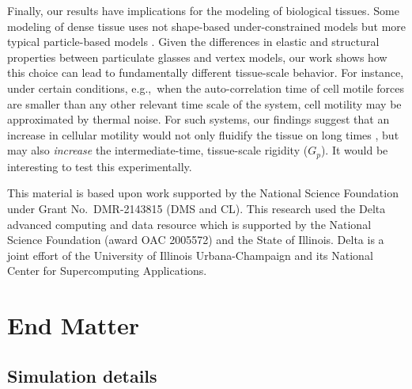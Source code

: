 \documentclass[aps,reprint,superscriptaddress,nofootinbib, notitlepage,prl]{revtex4-2}
\begin{document}
Finally, our results have implications for the modeling of biological tissues.
Some modeling of dense tissue uses not shape-based under-constrained models but more typical particle-based models \cite{Germann2019,Henkes2020}.
Given the differences in elastic and structural properties between particulate glasses and vertex models, our work shows how this choice can lead to fundamentally different tissue-scale behavior.
For instance, under certain conditions, e.g.,\ when the auto-correlation time of cell motile forces are smaller than any other relevant time scale of the system, cell motility may be approximated by thermal noise. For such systems, our findings suggest that an increase in cellular motility would not only fluidify the tissue on long times \cite{bi2016motility}, but may also \emph{increase} the intermediate-time, tissue-scale rigidity ($G_p$).
It would be interesting to test this experimentally.

\begin{acknowledgments}
This material is based upon work supported by the National Science Foundation under Grant No.~DMR-2143815 (DMS and CL). 
This research used the Delta advanced computing and data resource which is supported by the National Science Foundation (award OAC 2005572) and the State of Illinois. Delta is a joint effort of the University of Illinois Urbana-Champaign and its National Center for Supercomputing Applications.
\end{acknowledgments}



\appendix

\section{End Matter}

\subsection{Simulation details}
\end{document}
